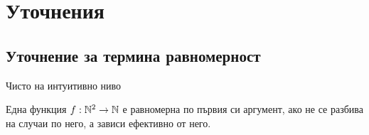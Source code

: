 


\ifnotes
      

      \section{Уточнения}
      \subsection{Уточнение за термина равномерност}
      Чисто на интуитивно ниво

      Една функция $f: {\mathbb{N}}^2 \to {\mathbb{N}}$ е равномерна по първия си аргумент, ако не се разбива на случаи по него, а зависи ефективно от него.
\fi
